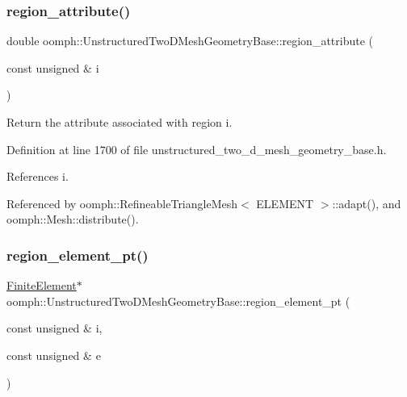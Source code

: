\subsubsection{\texorpdfstring{region\+\_\+attribute()}{region\_attribute()}}
{\footnotesize\ttfamily double oomph\+::\+Unstructured\+Two\+D\+Mesh\+Geometry\+Base\+::region\+\_\+attribute (\begin{DoxyParamCaption}\item[{const unsigned \&}]{i }\end{DoxyParamCaption})\hspace{0.3cm}{\ttfamily [inline]}}



Return the attribute associated with region i. 



Definition at line 1700 of file unstructured\+\_\+two\+\_\+d\+\_\+mesh\+\_\+geometry\+\_\+base.\+h.



References i.



Referenced by oomph\+::\+Refineable\+Triangle\+Mesh$<$ E\+L\+E\+M\+E\+N\+T $>$\+::adapt(), and oomph\+::\+Mesh\+::distribute().

\mbox{\label{classoomph_1_1UnstructuredTwoDMeshGeometryBase_abfc8c7de4f4b0050c818a0186e087531}} 
\subsubsection{\texorpdfstring{region\+\_\+element\+\_\+pt()}{region\_element\_pt()}}
{\footnotesize\ttfamily \hyperlink{classoomph_1_1FiniteElement}{Finite\+Element}$\ast$ oomph\+::\+Unstructured\+Two\+D\+Mesh\+Geometry\+Base\+::region\+\_\+element\+\_\+pt (\begin{DoxyParamCaption}\item[{const unsigned \&}]{i,  }\item[{const unsigned \&}]{e }\end{DoxyParamCaption})\hspace{0.3cm}{\ttfamily [inline]}}



